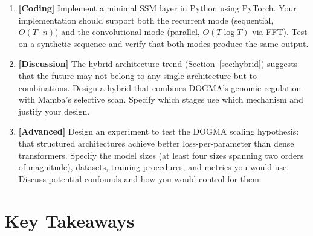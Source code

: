 \begin{enumerate}[label=\textbf{15.\arabic*.}, leftmargin=2.5em]
\item \textbf{[Coding]} Implement a minimal SSM layer in Python using PyTorch. Your implementation should support both the recurrent mode (sequential, $O(T \cdot n)$) and the convolutional mode (parallel, $O(T \log T)$ via FFT). Test on a synthetic sequence and verify that both modes produce the same output.

\item \textbf{[Discussion]} The hybrid architecture trend (Section~\ref{sec:hybrid}) suggests that the future may not belong to any single architecture but to combinations. Design a hybrid that combines DOGMA's genomic regulation with Mamba's selective scan. Specify which stages use which mechanism and justify your design.

\item \textbf{[Advanced]} Design an experiment to test the DOGMA scaling hypothesis: that structured architectures achieve better loss-per-parameter than dense transformers. Specify the model sizes (at least four sizes spanning two orders of magnitude), datasets, training procedures, and metrics you would use. Discuss potential confounds and how you would control for them.
\end{enumerate}

\section{Key Takeaways}

